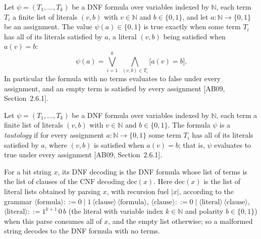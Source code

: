 \begin{definition}
\label{Std.Sat.DNF.eval}
\leanok
{}
Let $\psi = (T_1, \dots, T_k)$ be a DNF formula over variables indexed by $\mathbb{N}$,
each term $T_i$ a finite list of literals $(v,b)$ with $v \in \mathbb{N}$ and
$b \in \{0,1\}$, and let $a : \mathbb{N} \to \{0,1\}$ be an assignment. The value
$\psi(a) \in \{0,1\}$ is true exactly when some term $T_i$ has all of its literals
satisfied by $a$, a literal $(v,b)$ being satisfied when $a(v) = b$:
\[
  \psi(a) = \bigvee_{i=1}^{k} \; \bigwedge_{(v,b) \in T_i} \bigl[a(v) = b\bigr].
\]
In particular the formula with no terms evaluates to false under every assignment, and an
empty term is satisfied by every assignment [AB09, Section~2.6.1].
\end{definition}

\begin{definition}
\label{Std.Sat.DNF.Tautology}
\leanok
{}
Let $\psi = (T_1, \dots, T_k)$ be a DNF formula over variables indexed by $\mathbb{N}$,
each term a finite list of literals $(v,b)$ with $v \in \mathbb{N}$ and $b \in \{0,1\}$.
The formula $\psi$ is a \emph{tautology} if for every assignment
$a : \mathbb{N} \to \{0,1\}$ some term $T_i$ has all of its literals satisfied by $a$,
where $(v,b)$ is satisfied when $a(v) = b$; that is, $\psi$ evaluates to true under every
assignment [AB09, Section~2.6.1].
\end{definition}

\begin{definition}
\label{Std.Sat.DNF.decode}
\leanok
{}
For a bit string $x$, its DNF decoding is the DNF formula whose list of terms is the list
of clauses of the CNF decoding $\mathrm{dec}(x)$. Here $\mathrm{dec}(x)$ is the list of
literal lists obtained by parsing $x$, with recursion fuel $|x|$, according to the grammar
$\langle\text{formula}\rangle ::= 0 \mid 1\,\langle\text{clause}\rangle\,\langle\text{formula}\rangle$,
$\langle\text{clause}\rangle ::= 0 \mid \langle\text{literal}\rangle\,\langle\text{clause}\rangle$,
$\langle\text{literal}\rangle ::= 1^{k+1}\,0\,b$ (the literal with variable index
$k \in \mathbb{N}$ and polarity $b \in \{0,1\}$) when this parse consumes all of $x$, and
the empty list otherwise; so a malformed string decodes to the DNF formula with no terms.
\end{definition}

